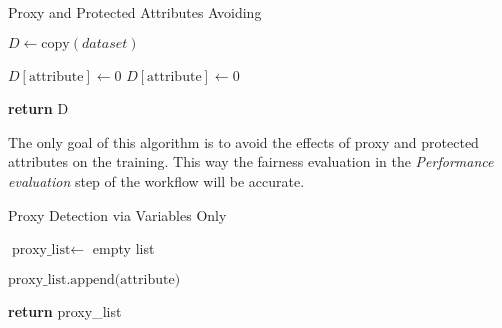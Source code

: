\documentclass[12pt,a4paper,openright,twoside]{book}
\begin{document}
\begin{algorithm}[H]
    \caption{Proxy and Protected Attributes Avoiding}
    \label{alg:proxy_protected_attributes_avoiding}
    \begin{algorithmic}[1]
        
        \State $D \gets \text{copy}(dataset)$
        
                \State $D[\text{attribute}] \gets 0$ 
            \EndIf
                \State $D[\text{attribute}] \gets 0$
            \EndIf
        \EndFor
        
        \State \textbf{return} D
    \end{algorithmic}
\end{algorithm}

The only goal of this algorithm is to avoid the effects of proxy and protected attributes on the training. This way the fairness evaluation in the \emph{Performance evaluation} step of the workflow will be accurate.


\begin{algorithm}[H]
    \caption{Proxy Detection via Variables Only}
    \label{alg:proxy_detection_variables_only}
    \begin{algorithmic}[1]
        
        \State $\text{proxy\_list} \gets$ empty list\;
        
                    \State $\text{proxy\_list.append(attribute)}$
                \EndIf
            \EndFor
        \EndFor
        
        \State \textbf{return} proxy\_list
    \end{algorithmic}
\end{algorithm}
\end{document}
